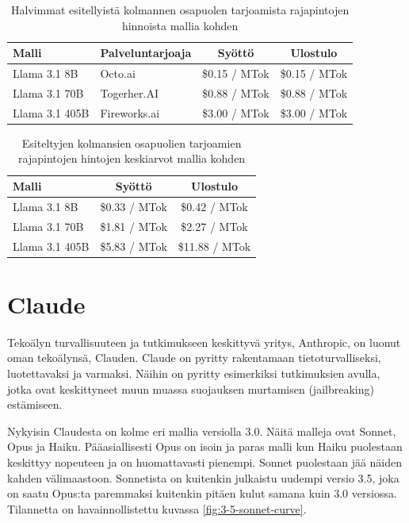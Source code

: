 \begin{table}[H]
  \centering
  \caption{Halvimmat esitellyistä kolmannen osapuolen tarjoamista rajapintojen hinnoista mallia kohden \parencite{llama}}
  \label{tab:third-party-llama-prices}
  \begin{tabular}{llcc}
    \textbf{Malli} & \textbf{Palveluntarjoaja} & \textbf{Syöttö} & \textbf{Ulostulo} \\
    \hline
    Llama 3.1 8B   & Octo.ai      & \$0.15 / MTok & \$0.15 / MTok \\
    Llama 3.1 70B  & Togerher.AI  & \$0.88 / MTok & \$0.88 / MTok \\
    Llama 3.1 405B & Fireworks.ai & \$3.00 / MTok & \$3.00 / MTok \\
    \hline
  \end{tabular}
\end{table}

\begin{table}[H]
  \centering
  \caption{Esiteltyjen kolmansien osapuolien tarjoamien rajapintojen hintojen keskiarvot mallia kohden \parencite{llama}}
  \label{tab:third-party-llama-prices}
  \begin{tabular}{lcc}
    \textbf{Malli} & \textbf{Syöttö} & \textbf{Ulostulo} \\
    \hline
    Llama 3.1 8B   & \$0.33 / MTok &  \$0.42 / MTok \\
    Llama 3.1 70B  & \$1.81 / MTok &  \$2.27 / MTok \\
    Llama 3.1 405B & \$5.83 / MTok & \$11.88 / MTok \\
    \hline
  \end{tabular}
\end{table}

\section{Claude}

Tekoälyn turvallisuuteen ja tutkimukseen keskittyvä yritys, Anthropic, on
luonut oman tekoälynsä, Clauden. Claude on pyritty rakentamaan
tietoturvalliseksi, luotettavaksi ja varmaksi. \parencite{anthropicCompany}
\parencite{anthropicClaude} Näihin on pyritty esimerkiksi tutkimuksien avulla,
jotka ovat keskittyneet muun muassa suojauksen murtamisen (jailbreaking)
estämiseen. \parencite{anthropicResearch}

Nykyisin Claudesta on kolme eri mallia versiolla 3.0. Näitä malleja ovat
Sonnet, Opus ja Haiku. Pääasiallisesti Opus on isoin ja paras malli kun Haiku
puolestaan keskittyy nopeuteen ja on huomattavasti pienempi. Sonnet puolestaan
jää näiden kahden välimaastoon. Sonnetista on kuitenkin julkaistu uudempi
versio 3.5, joka on saatu Opus:ta paremmaksi kuitenkin pitäen kulut samana kuin
3.0 versiossa. Tilannetta on havainnollistettu kuvassa
\ref{fig:3-5-sonnet-curve}. \parencite{anthropicAPIDocsModels}

